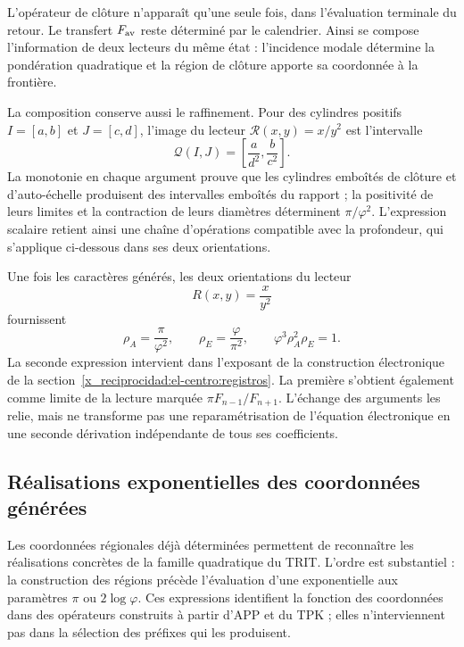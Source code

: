 L'opérateur de clôture n'apparaît qu'une seule fois, dans l'évaluation terminale du retour. Le transfert \(F_{\rm av}\) reste déterminé par le calendrier. Ainsi se compose l'information de deux lecteurs du même état : l'incidence modale détermine la pondération quadratique et la région de clôture apporte sa coordonnée à la frontière.

La composition conserve aussi le raffinement. Pour des cylindres positifs
\(I=[a,b]\) et \(J=[c,d]\), l'image du lecteur
\(\mathcal R(x,y)=x/y^2\) est l'intervalle
\[
 \mathcal Q(I,J)=\left[\frac{a}{d^2},\frac{b}{c^2}\right].
\]
La monotonie en chaque argument prouve que les cylindres emboîtés de
clôture et d'auto-échelle produisent des intervalles emboîtés du rapport ; la
positivité de leurs limites et la contraction de leurs diamètres déterminent
\(\pi/\varphi^2\). L'expression scalaire retient ainsi une chaîne
d'opérations compatible avec la profondeur, qui s'applique
ci-dessous dans ses deux orientations.



Une fois les caractères générés, les deux orientations du lecteur
\[
 R(x,y)=\frac{x}{y^2}
\]
fournissent
\begin{equation}
 \rho_A=\frac\pi{\varphi^2},\qquad
 \rho_E=\frac\varphi{\pi^2},\qquad
 \varphi^3\rho_A^2\rho_E=1.
 \label{x_reciprocidad:eq:areal-electron}
\end{equation}
La seconde expression intervient dans l’exposant de la construction électronique de la section~\ref{x_reciprocidad:el-centro:registros}. La première s’obtient également comme limite de la lecture marquée \(\pi F_{n-1}/F_{n+1}\). L’échange des arguments les relie, mais ne transforme pas une reparamétrisation de l’équation électronique en une seconde dérivation indépendante de tous ses coefficients.


\subsection{Réalisations exponentielles des coordonnées générées}
\label{x_reciprocidad:euler-trit-articulacion}

Les coordonnées régionales déjà déterminées permettent de reconnaître les
réalisations concrètes de la famille quadratique du TRIT. L’ordre est
substantiel : la construction des régions précède l’évaluation d’une
exponentielle aux paramètres \(\pi\) ou \(2\log\varphi\). Ces expressions
identifient la fonction des coordonnées dans des opérateurs construits à partir
d’APP et du TPK ; elles n’interviennent pas dans la sélection des préfixes qui les produisent.

